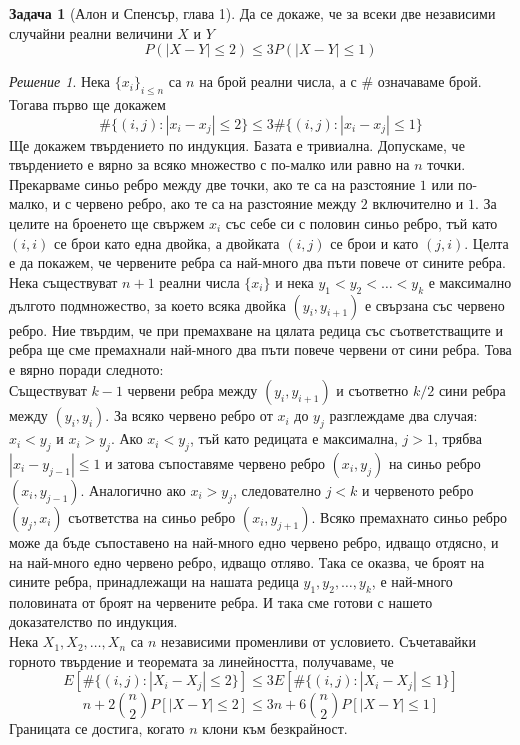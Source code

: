\documentclass[11 pt, a4paper]{article}
\theoremstyle{definition}
\newtheorem{p}{Задача}
\theoremstyle{remark}
\newtheorem*{s}{Решение}
\begin{document}
\begin{p}[Алон и Спенсър, глава 1]
Да се докаже, че за всеки две независими случайни реални величини $X$ и $Y$
\begin{equation*}
P(|X-Y|\leq2)\leq 3P(|X-Y|\leq1)
\end{equation*}
\end{p}
\begin{s}
Нека $\big\{x_i\big\}_{i\leq n}$ са $n$ на брой реални числа, а с $\#$ означаваме брой. Тогава първо ще докажем
\begin{equation*}
\#\big\{(i,j):|x_i-x_j|\leq2\big\}\leq3\# \big\{(i,j):|x_i-x_j|\leq 1\big\}
\end{equation*}
Ще докажем твърдението по индукция. Базата е тривиална.  Допускаме, че твърдението е вярно за всяко множество с по-малко или равно на $n$ точки. Прекарваме синьо ребро между две точки, ако те са на разстояние $1$ или по-малко, и с червено ребро, ако те са на разстояние между $2$ включително и $1$. За целите на броенето ще свържем $x_i$ със себе си с половин синьо ребро, тъй като $(i,i)$ се брои като една двойка, а двойката $(i,j)$ се брои и като $(j,i)$. Целта е да покажем, че червените ребра са най-много два пъти повече от сините ребра.\\
Нека съществуват $n+1$ реални числа $\big\{x_i\big\}$ и нека $y_1<y_2<\dots<y_k$ е максимално дългото подмножество, за което всяка двойка $(y_i,y_{i+1})$ е свързана със червено ребро. Ние твърдим, че при премахване на цялата редица със съответстващите и ребра ще сме премахнали най-много два пъти повече червени от сини ребра. Това е вярно поради следното:\\
Съществуват $k-1$ червени ребра между $(y_i,y_{i+1})$ и съответно $k/2$ сини ребра между $(y_i,y_i)$. За всяко червено ребро от $x_i$ до $y_j$ разглеждаме два случая: $x_i<y_j$ и $x_i>y_j$. Ако $x_i<y_j$, тъй като редицата е максимална, $j>1$, трябва $|x_i-y_{j-1}|\leq 1$ и затова съпоставяме червено ребро $(x_i,y_j)$ на синьо ребро $(x_i, y_{j-1})$. Аналогично ако $x_i>y_j$, следователно $j<k$ и червеното ребро $(y_j,x_i)$ съответства на синьо ребро $(x_i,y_{j+1})$. Всяко премахнато синьо ребро може да бъде съпоставено на най-много едно червено ребро, идващо отдясно, и на най-много едно червено ребро, идващо отляво. Така се оказва, че броят на сините ребра, принадлежащи на нашата редица $y_1,y_2,\dots,y_k$, е най-много половината от броят на червените ребра. И така сме готови с нашето доказателство по индукция.\\

Нека $X_1,X_2,\dots,X_n$ са $n$ независими променливи от условието. Съчетавайки горното твърдение и теоремата за линейността, получаваме, че
\begin{equation*}
E[\#\big\{(i,j):|X_i-X_j|\leq 2\big\}]\leq 3E[\#\big\{(i,j):|X_i-X_j|\leq 1\big\}]
\end{equation*}
\begin{equation*}
n+2{{n}\choose 2}P[|X-Y|\leq 2]\leq 3n+6{{n}\choose 2}P[|X-Y|\leq 1]
\end{equation*}
Границата се достига, когато $n$ клони към безкрайност.
\end{s}
\end{document}
